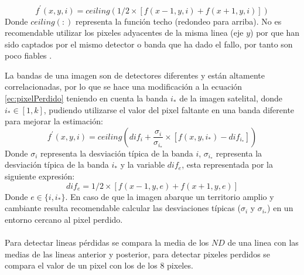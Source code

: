 		\begin{equation}\label{ec:pixelPerdido}
		f^{'}(x,y,i) =  ceiling(1/2 \times [f(x-1,y,i) + f(x+1,y,i)])
		\end{equation} 
Donde $ ceiling(:) $ representa la funci\'on techo (redondeo para arriba). No es recomendable utilizar los pixeles adyacentes de la misma linea (eje $ y $) por que han sido captados por el mismo detector o banda que ha dado el fallo, por tanto son poco fiables \cite{cor2015radio}.

La bandas de una imagen son de detectores diferentes y est\'an altamente correlacionadas, por lo que se hace una modificaci\'on a la ecuaci\'on \ref{ec:pixelPerdido} teniendo en cuenta la banda $ i_{*} $ de la imagen satelital, donde $ i_{*} \in [1,k] $, pudiendo utilizarse el valor del pixel faltante en una banda diferente para mejorar la estimaci\'on:
		\begin{equation}
		f^{'}(x,y,i) = ceiling( dif_{i}+ \dfrac{\sigma_{i}}{\sigma_{i_{*}}} \times [f(x,y,i_{*})-dif_{i_{*}}])
		\end{equation} 
Donde $ \sigma_{i} $ representa la desviaci\'on t\'ipica de la banda $ i $, $ \sigma_{i_{*}} $ representa la desviaci\'on t\'ipica de la banda $ i_{*} $ y la variable $ dif_{e} $, esta representada por la siguiente expresi\'on:
		\begin{equation}
		 dif_{e}  = 1/2 \times [f(x-1,y,e) + f(x+1,y,e)]
		\end{equation} 
Donde $ e \in \{ i,i_{*}\} $. En caso de que la imagen abarque un territorio amplio y cambiante resulta recomendable calcular las desviaciones t\'ipicas ($ \sigma_{i} $ y $ \sigma_{i_{*}} $) en un entorno cercano al pixel perdido.\\~\\
Para detectar lineas p\'erdidas se compara la media de los $ ND $ de una linea con las medias de las lineas anterior y posterior, para detectar pixeles perdidos se compara el valor de un pixel con los de los 8 pixeles.

